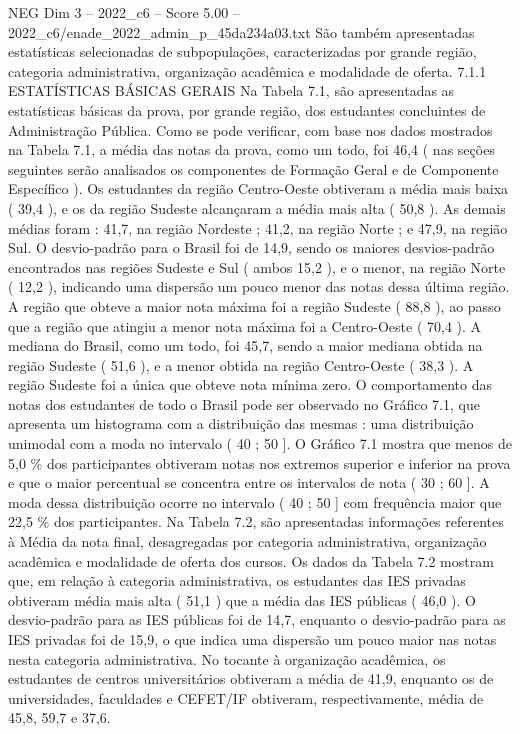\begin{textsample}{NEG Dim 3 – 2022\_c6 – Score 5.00 – 2022\_c6/enade\_2022\_admin\_p\_45da234a03.txt}
São também apresentadas estatísticas selecionadas de subpopulações, caracterizadas por grande região, categoria administrativa, organização acadêmica e modalidade de oferta. 7.1.1 ESTATÍSTICAS BÁSICAS GERAIS Na Tabela 7.1, são apresentadas as estatísticas básicas da prova, por grande região, dos estudantes concluintes de Administração Pública.
Como se pode verificar, com base nos dados mostrados na Tabela 7.1, a média das notas da prova, como um todo, foi 46,4 ( nas seções seguintes serão analisados os componentes de Formação Geral e de Componente Específico ).
Os estudantes da região Centro-Oeste obtiveram a média mais baixa ( 39,4 ), e os da região Sudeste alcançaram a média mais alta ( 50,8 ).
As demais médias foram : 41,7, na região Nordeste ; 41,2, na região Norte ; e 47,9, na região Sul.
O desvio-padrão para o Brasil foi de 14,9, sendo os maiores desvios-padrão encontrados nas regiões Sudeste e Sul ( ambos 15,2 ), e o menor, na região Norte ( 12,2 ), indicando uma dispersão um pouco menor das notas dessa última região.
A região que obteve a maior nota máxima foi a região Sudeste ( 88,8 ), ao passo que a região que atingiu a menor nota máxima foi a Centro-Oeste ( 70,4 ).
A mediana do Brasil, como um todo, foi 45,7, sendo a maior mediana obtida na região Sudeste ( 51,6 ), e a menor obtida na região Centro-Oeste ( 38,3 ).
A região Sudeste foi a única que obteve nota mínima zero.
O comportamento das notas dos estudantes de todo o Brasil pode ser observado no Gráfico 7.1, que apresenta um histograma com a distribuição das mesmas : uma distribuição unimodal com a moda no intervalo ( 40 ; 50 ].
O Gráfico 7.1 mostra que menos de 5,0 \% dos participantes obtiveram notas nos extremos superior e inferior na prova e que o maior percentual se concentra entre os intervalos de nota ( 30 ; 60 ].
A moda dessa distribuição ocorre no intervalo ( 40 ; 50 ] com frequência maior que 22,5 \% dos participantes.
Na Tabela 7.2, são apresentadas informações referentes à Média da nota final, desagregadas por categoria administrativa, organização acadêmica e modalidade de oferta dos cursos.
Os dados da Tabela 7.2 mostram que, em relação à categoria administrativa, os estudantes das IES privadas obtiveram média mais alta ( 51,1 ) que a média das IES públicas ( 46,0 ).
O desvio-padrão para as IES públicas foi de 14,7, enquanto o desvio-padrão para as IES privadas foi de 15,9, o que indica uma dispersão um pouco maior nas notas nesta categoria administrativa.
No tocante à organização acadêmica, os estudantes de centros universitários obtiveram a média de 41,9, enquanto os de universidades, faculdades e CEFET/IF obtiveram, respectivamente, média de 45,8, 59,7 e 37,6.

\end{textsample}
